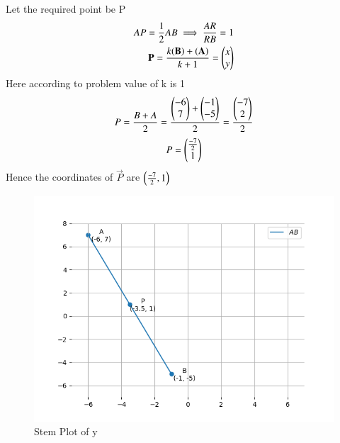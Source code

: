 \documentclass[journal]{IEEEtran}
\begin{document}
Let the required point be P
\begin{align}
AP=\frac{1}{2}AB \implies \frac{AR}{RB}=1\\
\vec{P}=\frac{k(\vec{B})+(\vec{A})}{k+1}=\myvec{x\\y}\\
\end{align}
Here according to problem value of k is 1\\
\begin{align}
P=\frac{B+A}{2}=\frac{\myvec{-6\\7}+\myvec{-1\\-5}}{2}=\frac{\myvec{-7\\2}}{2}\\
\end{align}
\begin{align}
P=\myvec{\frac{-7}{2}\\1}
\end{align}
Hence the coordinates of $\vec{P}$ are $\brak{\frac{-7}{2},1}$
\begin{figure}[h!]
   \centering
   \includegraphics[width=0.7\columnwidth]{figs/fig1.png}
   \caption{Stem Plot of y}
   \label{stemplot}
\end{figure}
\end{document}
